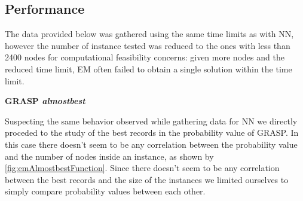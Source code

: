 

\subsection{Performance}

The data provided below was gathered using the same time limits as with NN, however the number of instance tested was reduced to the ones with less than 2400 nodes for computational feasibility concerns: given more nodes and the reduced time limit, EM often failed to obtain a single solution within the time limit.

\textbf{GRASP \textit{almostbest}}

Suspecting the same behavior observed while gathering data for NN we directly proceded to the study of the best records in the probability value of GRASP.
In this case there doesn't seem to be any correlation between the probability value and the number of nodes inside an instance, as shown by \figurename{ \ref{fig:emAlmostbestFunction}}.
Since there doesn't seem to be any correlation between the best records and the size of the instances we limited ourselves to simply compare probability values between each other.

